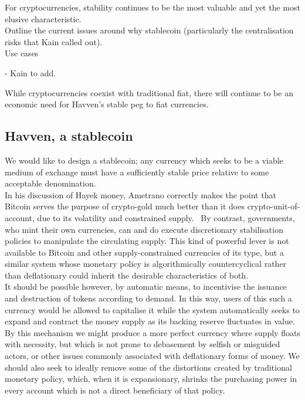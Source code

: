 \documentclass{article}
\begin{document}
\noindent For cryptocurrencies, stability continues to be the most valuable and yet the most elusive characteristic. \\

\noindent Outline the current issues around why stablecoin (particularly the centralisation risks that Kain called out). \\

Use cases

- Kain to add.

\noindent While cryptocurrencies coexist with traditional fiat, there will continue to be an economic need for Havven's stable peg to fiat currencies. \\

\subsection{Havven, a stablecoin}

\noindent We would like to design a stablecoin; any currency which seeks to be a viable medium of exchange must have a sufficiently stable price relative to some acceptable denomination. \\

\noindent  In his discussion of Hayek money, Ametrano correctly makes the point that Bitcoin serves the purpose of crypto-gold much better than it does crypto-unit-of-account, due to its volatility and constrained supply.~\cite{ametrano2016hayek} By contrast, governments, who mint their own currencies, can and do execute discretionary stabilisation policies to manipulate the circulating supply. This kind of powerful lever is not available to Bitcoin and other supply-constrained currencies of its type, but a similar system whose monetary policy is algorithmically countercyclical rather than deflationary could inherit the desirable characteristics of both. \\

\noindent It should be possible however, by automatic means, to incentivise the issuance and destruction of tokens according to demand. In this way, users of this such a currency would be allowed to capitalise it while the system automatically seeks to expand and contract the money supply as its backing reserve fluctuates in value. By this mechanism we might produce a more perfect currency where supply floats with necessity, but which is not prone to debasement by selfish or misguided actors, or other issues commonly associated with deflationary forms of money. We should also seek to ideally remove some of the distortions created by traditional monetary policy, which, when it is expansionary, shrinks the purchasing power in every account which is not a direct beneficiary of that policy. \\
\end{document}
